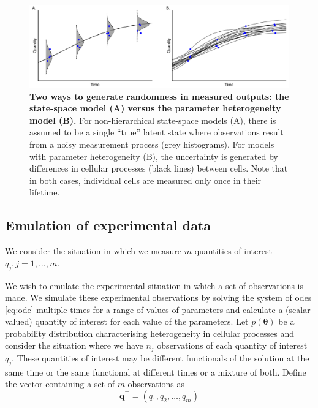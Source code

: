 \begin{figure}[H]
	\centerline{\includegraphics[width=\textwidth]{../figures/data_generation.pdf}}
	\caption{\textbf{Two ways to generate randomness in measured outputs: the state-space model (A) versus the parameter heterogeneity model (B).} For non-hierarchical state-space models (A), there is assumed to be a single ``true'' latent state where observations result from a noisy measurement process (grey histograms). For models with parameter heterogeneity (B), the uncertainty is generated by differences in cellular processes (black lines) between cells. Note that in both cases, individual cells are measured only once in their lifetime.}
	\label{fig:data_generation}
\end{figure}

\subsection{Emulation of experimental data}

We consider the situation in which we measure $m$ quantities of interest $q_j, j=1, \dots, m$.

We wish to emulate the experimental situation in which a set of observations is made. We simulate these experimental observations by solving the system of odes \eqref{eq:ode} multiple times for a range of values of parameters and calculate a (scalar-valued) quantity of interest for each value of the parameters.  Let $p(\boldsymbol{\theta})$ be a probability distribution characterising heterogeneity in cellular processes and consider the situation where we have $n_j$ observations of each quantity of interest $q_j$. These quantities of interest may be different functionals of the solution at the same time or the same functional at different times or a mixture of both. Define the vector containing a set of $m$ observations as
\begin{equation}
\boldsymbol{q}^\top = \left( q_1, q_2, \dots, q_m \right)
\end{equation}

